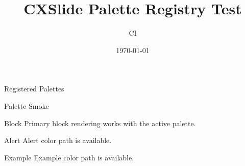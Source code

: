 \documentclass[aspectratio=169, UTF8]{ctexbeamer}
\title{CXSlide Palette Registry Test}
\author{CI}
\date{\today}
\begin{document}
\begin{frame}
  \titlepage
\end{frame}

\begin{frame}{Registered Palettes}
  \begin{itemize}
  \end{itemize}
\end{frame}

\begin{frame}{Palette Smoke}
  \begin{block}{Block}
    Primary block rendering works with the active palette.
  \end{block}
  \begin{alertblock}{Alert}
    Alert color path is available.
  \end{alertblock}
  \begin{exampleblock}{Example}
    Example color path is available.
  \end{exampleblock}
\end{frame}
\end{document}
